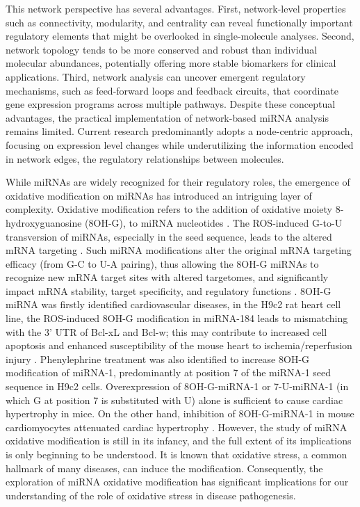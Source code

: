 This network perspective has several advantages. First, network-level properties such as connectivity, modularity, and centrality can reveal functionally important regulatory elements that might be overlooked in single-molecule analyses. Second, network topology tends to be more conserved and robust than individual molecular abundances, potentially offering more stable biomarkers for clinical applications. Third, network analysis can uncover emergent regulatory mechanisms, such as feed-forward loops and feedback circuits, that coordinate gene expression programs across multiple pathways. Despite these conceptual advantages, the practical implementation of network-based miRNA analysis remains limited. Current research predominantly adopts a node-centric approach, focusing on expression level changes while underutilizing the information encoded in network edges, the regulatory relationships between molecules.

While miRNAs are widely recognized for their regulatory roles, the emergence of oxidative modification on miRNAs has introduced an intriguing layer of complexity. Oxidative modification refers to the addition of oxidative moiety 8-hydroxyguanosine (8OH-G), to miRNA nucleotides \cite{depaolis2021epitrans}. The ROS-induced G-to-U transversion of miRNAs, especially in the seed sequence, leads to the altered mRNA targeting \cite{wang2015oxidativ,seok2020position}. Such miRNA modifications alter the original mRNA targeting efficacy (from G-C to U-A pairing), thus allowing the 8OH-G miRNAs to recognize new mRNA target sites with altered targetomes, and significantly impact mRNA stability, target specificity, and regulatory functions \cite{wang2015oxidativ}. 8OH-G miRNA was firstly identified cardiovascular diseases, in the H9c2 rat heart cell line, the ROS-induced 8OH-G modification in miRNA-184 leads to mismatching with the 3' UTR of Bcl-xL and Bcl-w; this may contribute to increased cell apoptosis and enhanced susceptibility of the mouse heart to ischemia/reperfusion injury \cite{wang2015oxidativ}. Phenylephrine treatment was also identified to increase 8OH-G modification of miRNA-1, predominantly at position 7 of the miRNA-1 seed sequence in H9c2 cells. Overexpression of 8OH-G-miRNA-1 or 7-U-miRNA-1 (in which G at position 7 is substituted with U) alone is sufficient to cause cardiac hypertrophy in mice. On the other hand, inhibition of 8OH-G-miRNA-1 in mouse cardiomyocytes attenuated cardiac hypertrophy \cite{seok2020position}. However, the study of miRNA oxidative modification is still in its infancy, and the full extent of its implications is only beginning to be understood. It is known that oxidative stress, a common hallmark of many diseases, can induce the modification. Consequently, the exploration of miRNA oxidative modification has significant implications for our understanding of the role of oxidative stress in disease pathogenesis.

